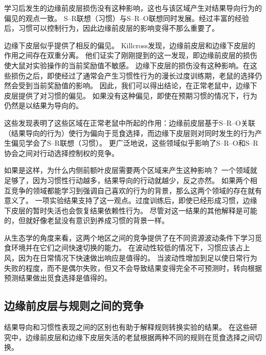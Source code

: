 学习后发生的边缘前皮层损伤没有这种影响\cite{ostlund2005lesions}，这也与该区域产生对结果导向行为的偏见的观点一致。
S–R联想（习惯）与S–R–O联想同时发展。经过丰富的经验后，习惯可以控制行为，因此边缘前皮层的影响变得不那么重要了。\par


边缘下皮层似乎提供了相反的偏见。
Killcross\cite{killcross2003coordination}发现，边缘前皮层和边缘下皮层的作用之间存在双重分离。
他们证实了刚刚提到的这一发现，即边缘前皮层的损伤使大鼠对实验操作的当前奖励值不敏感。
边缘下皮层的损伤没有这种影响。在这些损伤之后，即使经过了通常会产生习惯性行为的漫长过度训练期，老鼠的选择仍然会受到当前奖励值的影响。
因此，我们可以得出结论，在正常老鼠中，边缘下皮层提供了对习惯的偏见。
如果没有这种偏见，即使在预期习惯的情况下，行为仍然是以结果为导向的。\par


这些发现表明了这些区域在正常老鼠中所起的作用：边缘前皮层基于S–R–O关联（结果导向的行为）使行为偏向于觅食选择，而边缘下皮层则对同时发生的行为产生偏见学会了S–R联想（习惯）。
更广泛地说，这些领域似乎影响了S–R–O和S–R协会之间对行动选择控制权的竞争。\par


如果是这样，为什么内侧前额叶皮层需要两个区域来产生这种影响？
一个领域就足够了，因为习惯性行动越多，结果导向的行动就越少，反之亦然。
如果两个相互竞争的领域都能学习到强调自己喜欢的行为的背景，那么这两个领域的存在就有意义了。
一项实验结果支持了这一观点。过度训练后，即使已经形成习惯，边缘下皮层的暂时失活也会恢复结果依赖性行为\cite{coutureau2003inactivation}。
尽管对这一结果的其他解释是可能的，但就好像老鼠没有意识到养成习惯的背景一样。\par


从生态学的角度来看，这两个地区之间的竞争提供了在不同资源波动条件下学习觅食环境并在它们之间快速切换的能力。
在波动性较低的情况下，习惯应该占上风，因为在日常情况下快速做出响应是值得的。
当波动性增加到足以使日常行为失败的程度，而不是偶尔失败，但又不会导致结果变得完全不可预测时，转向根据预测结果做出觅食选择是值得的。\par



\subsection{边缘前皮层与规则之间的竞争}

结果导向和习惯性表现之间的区别也有助于解释规则转换实验的结果。
在这些研究中，边缘前皮层和边缘下皮层失活的老鼠根据两种不同的规则在觅食选择之间切换。\par


